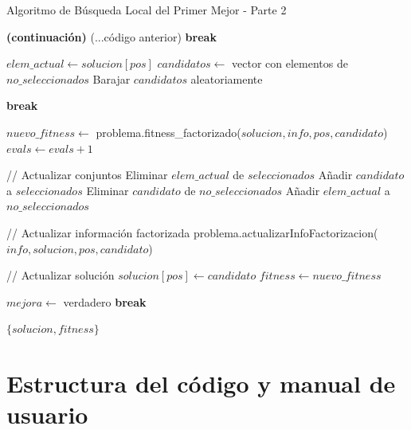 \documentclass{article}
\begin{document}
\begin{algorithm}
\caption{Algoritmo de Búsqueda Local del Primer Mejor - Parte 2}
\begin{algorithmic}[1]
 \textbf{(continuación)}
    \State (...código anterior)
             \textbf{break} \EndIf
            
            \State $elem\_actual \gets solucion[pos]$
            \State $candidatos \gets$ vector con elementos de $no\_seleccionados$
            \State Barajar $candidatos$ aleatoriamente
            
                 \textbf{break}\EndIf
                
                \State $nuevo\_fitness \gets$ problema.fitness\_factorizado($solucion, info, pos, candidato$)
                \State $evals \gets evals + 1$
                
                    \State // Actualizar conjuntos
                    \State Eliminar $elem\_actual$ de $seleccionados$
                    \State Añadir $candidato$ a $seleccionados$
                    \State Eliminar $candidato$ de $no\_seleccionados$
                    \State Añadir $elem\_actual$ a $no\_seleccionados$
                    
                    \State // Actualizar información factorizada
                    \State problema.actualizarInfoFactorizacion($info, solucion, pos, candidato$)
                    
                    \State // Actualizar solución
                    \State $solucion[pos] \gets candidato$
                    \State $fitness \gets nuevo\_fitness$
                    
                    \State $mejora \gets$ verdadero
                    \State \textbf{break} 
                \EndIf
            \EndFor
        \EndFor
    \EndWhile
    
    \State \Return $\{solucion, fitness\}$
\EndFunction
\end{algorithmic}
\end{algorithm}

\newpage
\section{Estructura del código y manual de usuario}
\end{document}
